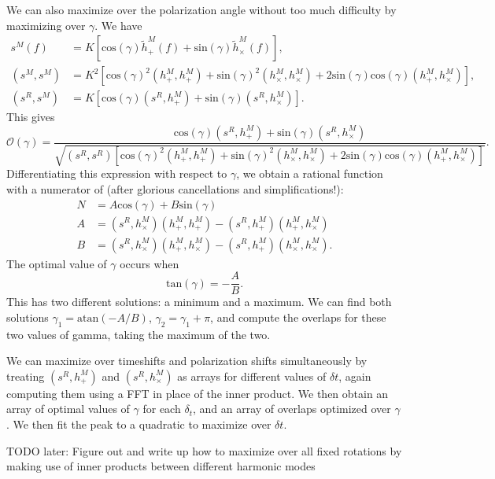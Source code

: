 \documentclass{article}
\begin{document}
We can also maximize over the polarization angle without too much difficulty
by maximizing over $\gamma$.
We have
\begin{align}
s^M(f) &= K \left[ \mathrm{cos}(\gamma) \tilde{h}_+^M(f) +
                  \mathrm{sin}(\gamma) \tilde{h}_\times^M(f) \right], \\
(s^M, s^M) &= K^2 \left[ 
        \mathrm{cos}(\gamma)^2 (h_+^M, h_+^M) +
        \mathrm{sin}(\gamma)^2 (h_\times^M, h_\times^M) +
        2\mathrm{sin}(\gamma)\mathrm{cos}(\gamma) (h_+^M, h_\times^M) \right], \\
(s^R, s^M) &= K \left[
        \mathrm{cos}(\gamma) (s^R, h_+^M) +
        \mathrm{sin}(\gamma) (s^R, h_\times^M) \right].
\end{align}
This gives
\begin{equation}
\mathcal{O}(\gamma) = \frac{ \mathrm{cos}(\gamma) (s^R, h_+^M) +
            \mathrm{sin}(\gamma) (s^R, h_\times^M) }{
            \sqrt{(s^R, s^R) \left[
            \mathrm{cos}(\gamma)^2 (h_+^M, h_+^M) +
            \mathrm{sin}(\gamma)^2 (h_\times^M, h_\times^M) +
            2\mathrm{sin}(\gamma)\mathrm{cos}(\gamma) (h_+^M, h_\times^M)\right]}}.
\end{equation}
Differentiating this expression with respect to $\gamma$, we obtain a rational
function with a numerator of (after glorious cancellations and simplifications!):
\begin{align}
N &= A\mathrm{cos}(\gamma) + B\mathrm{sin}(\gamma) \\
A &= (s^R, h_\times^M)(h_+^M, h_+^M) - (s^R, h_+^M)(h_+^M, h_\times^M) \\
B &= (s^R, h_\times^M)(h_+^M, h_\times^M) - (s^R, h_+^M)(h_\times^M, h_\times^M).
\end{align}
The optimal value of $\gamma$ occurs when
\begin{equation}
\mathrm{tan}(\gamma) = -\frac{A}{B}.
\end{equation}
This has two different solutions: a minimum and a maximum. We can find both
solutions $\gamma_1 = \mathrm{atan}(-A/B)$, $\gamma_2 = \gamma_1 + \pi$, and
compute the overlaps for these two values of gamma, taking the maximum of the
two.

We can maximize over timeshifts and polarization shifts simultaneously by
treating $(s^R, h_+^M)$ and $(s^R, h_\times^M)$ as arrays for different values
of $\delta t$, again computing them using a FFT in place of the inner product.
We then obtain an array of optimal values of $\gamma$ for each $\delta_t$, and
an array of overlaps optimized over $\gamma$. We then fit the peak to a
quadratic to maximize over $\delta t$.


TODO later: Figure out and write up how to maximize over all fixed rotations
by making use of inner products between different harmonic modes
\end{document}

